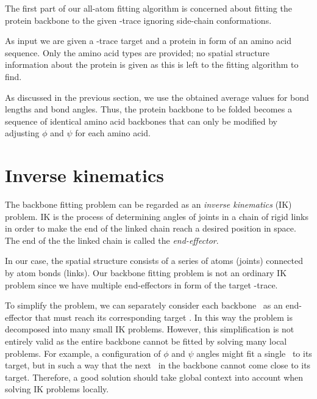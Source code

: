 The first part of our all-atom fitting algorithm is concerned about fitting the protein backbone to the given \Ca-trace ignoring side-chain conformations.

As input we are given a \Ca-trace target and a protein in form of an amino acid sequence.
Only the amino acid types are provided; no spatial structure information about the protein is given as this is left to the fitting algorithm to find.

As discussed in the previous section, we use the obtained average values for bond lengths and bond angles.
Thus, the protein backbone to be folded becomes a sequence of identical amino acid backbones that can only be modified by adjusting $\phi$ and $\psi$ for each amino acid.


\section{Inverse kinematics}
The backbone fitting problem can be regarded as an \emph{inverse kinematics} (IK) problem.
IK is the process of determining angles of joints in a chain of rigid links in order to make the end of the linked chain reach a desired position in space.
The end of the the linked chain is called the \emph{end-effector}.

In our case, the spatial structure consists of a series of atoms (joints) connected by atom bonds (links).
Our backbone fitting problem is not an ordinary IK problem since we have multiple end-effectors in form of the target \Ca-trace.

To simplify the problem, we can separately consider each backbone \Ca\ as an end-effector that must reach its corresponding target \Ca.
In this way the problem is decomposed into many small IK problems.
However, this simplification is not entirely valid as the entire backbone cannot be fitted by solving many local problems.
For example, a configuration of $\phi$ and $\psi$ angles might fit a single \Ca\ to its target, but in such a way that the next \Ca\ in the backbone cannot come close to its target.
Therefore, a good solution should take global context into account when solving IK problems locally. 


